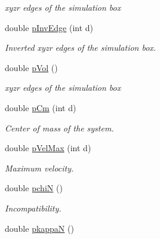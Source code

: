 \begin{DoxyCompactItemize}
\begin{DoxyCompactList}\small\item\em xyzr edges of the simulation box \end{DoxyCompactList}\item 
double \hyperlink{classVarData_a33833c025a5c9bf7ad5abab2cf9b1dac}{p\+Inv\+Edge} (int d)\hypertarget{classVarData_a33833c025a5c9bf7ad5abab2cf9b1dac}{}\label{classVarData_a33833c025a5c9bf7ad5abab2cf9b1dac}

\begin{DoxyCompactList}\small\item\em Inverted xyzr edges of the simulation box. \end{DoxyCompactList}\item 
double \hyperlink{classVarData_a3ccdbc4515f1de45728ef36368b9969a}{p\+Vol} ()\hypertarget{classVarData_a3ccdbc4515f1de45728ef36368b9969a}{}\label{classVarData_a3ccdbc4515f1de45728ef36368b9969a}

\begin{DoxyCompactList}\small\item\em xyzr edges of the simulation box \end{DoxyCompactList}\item 
double \hyperlink{classVarData_adfa118e0505b98efdcaf18dbd72cc11e}{p\+Cm} (int d)\hypertarget{classVarData_adfa118e0505b98efdcaf18dbd72cc11e}{}\label{classVarData_adfa118e0505b98efdcaf18dbd72cc11e}

\begin{DoxyCompactList}\small\item\em Center of mass of the system. \end{DoxyCompactList}\item 
double \hyperlink{classVarData_a0dd67b71b3296325972cd737b82f53c3}{p\+Vel\+Max} (int d)\hypertarget{classVarData_a0dd67b71b3296325972cd737b82f53c3}{}\label{classVarData_a0dd67b71b3296325972cd737b82f53c3}

\begin{DoxyCompactList}\small\item\em Maximum velocity. \end{DoxyCompactList}\item 
double \hyperlink{classVarData_a8def89edf23019d700fdbadb476e4c0a}{pchiN} ()\hypertarget{classVarData_a8def89edf23019d700fdbadb476e4c0a}{}\label{classVarData_a8def89edf23019d700fdbadb476e4c0a}

\begin{DoxyCompactList}\small\item\em Incompatibility. \end{DoxyCompactList}\item 
double \hyperlink{classVarData_af410b05a34ef11ae5d26090a7706493b}{pkappaN} ()\hypertarget{classVarData_af410b05a34ef11ae5d26090a7706493b}{}\label{classVarData_af410b05a34ef11ae5d26090a7706493b}


\end{DoxyCompactItemize}
